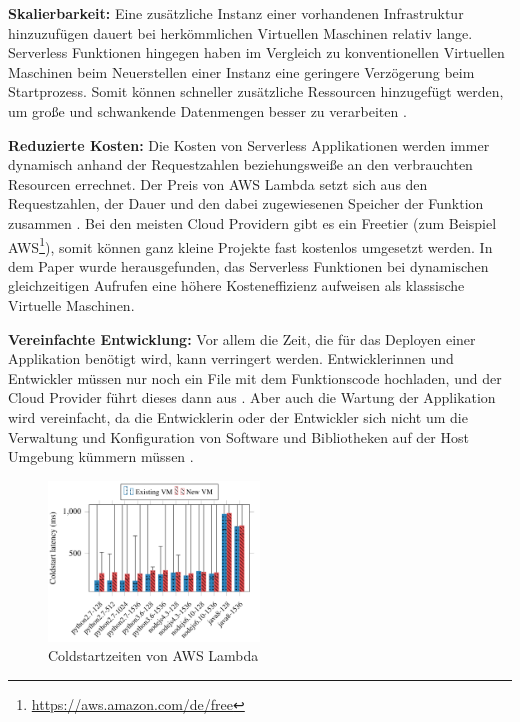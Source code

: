 \begin{flushleft}

\textbf{Skalierbarkeit:} Eine zusätzliche Instanz einer vorhandenen Infrastruktur hinzuzufügen dauert bei herkömmlichen Virtuellen Maschinen relativ lange. Serverless Funktionen hingegen haben im Vergleich zu konventionellen Virtuellen Maschinen beim Neuerstellen einer Instanz eine geringere Verzögerung beim Startprozess. Somit können schneller zusätzliche Ressourcen hinzugefügt werden, um große und schwankende Datenmengen besser zu verarbeiten \autocite[p.~6]{Lee}. \break

\textbf{Reduzierte Kosten:} Die Kosten von Serverless Applikationen werden immer dynamisch anhand der Requestzahlen beziehungsweiße an den verbrauchten Resourcen errechnet. Der Preis von AWS Lambda setzt sich aus den Requestzahlen, der Dauer und den dabei zugewiesenen Speicher der Funktion zusammen \autocite[]{Lambda}. Bei den meisten Cloud Providern gibt es ein Freetier (zum Beispiel AWS\footnote{\url{https://aws.amazon.com/de/free}}), somit können ganz kleine Projekte fast kostenlos umgesetzt werden. In dem Paper \cite{Lee} wurde herausgefunden, das Serverless Funktionen bei dynamischen gleichzeitigen Aufrufen eine höhere Kosteneffizienz aufweisen als klassische Virtuelle Maschinen. \break

\textbf{Vereinfachte Entwicklung:} Vor allem die Zeit, die für das Deployen einer Applikation benötigt wird, kann verringert werden. Entwicklerinnen und Entwickler müssen nur noch ein File mit dem Funktionscode hochladen, und der Cloud Provider führt dieses dann aus \autocite[p.~6]{Baldini}. Aber auch die Wartung der Applikation wird vereinfacht, da die Entwicklerin oder der Entwickler sich nicht um die Verwaltung und Konfiguration von Software und Bibliotheken auf der Host Umgebung kümmern müssen \autocite[p.~3]{Shafiei2019}.

\end{flushleft}

\begin{figure}[t]
	\centering
	\includegraphics[width=0.5\textwidth]{images/Coldstarts.png}
	\caption{
		Coldstartzeiten von AWS Lambda \autocite[p.~139]{Wang}
	}
	\label{figure:Coldstarts}
\end{figure}

